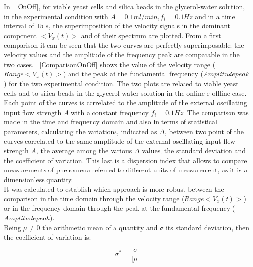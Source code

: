 \documentclass[journal]{IEEEtran}
\theoremstyle{definition}
\theoremstyle{remark}
\begin{document}
In ~\fig\ref{OnOff}, for viable yeast cells and silica beads in the glycerol-water solution, in the experimental condition with {$A=0.1 ml/min, f_i= 0.1 Hz$} and in a time interval of 15 $s$, the superimposition of the velocity signals in the dominant component  $<V_x(t)>$ and of their spectrum are plotted.
From a first comparison it can be seen that the two curves are perfectly superimposable: the velocity values and the amplitude of the frequency peak are comparable in the two cases.
~\fig\ref{ComparisonOnOff} shows the value of the velocity range ($Range<V_x(t)>$) and the peak at the fundamental frequency ($Amplitude peak$) for the two experimental condition. The two plots are related to viable yeast cells and to silica beads in the glycerol-water solution in the online e offline case. Each point of the curves is correlated to the amplitude of the external oscillating input flow strength $A$ with a constant frequency $f_i= 0.1 Hz$. 
The comparison was made in the time and frequency domain and also in terms of statistical parameters, calculating the variations, indicated as $\Delta$, between two point of the curves correlated to the same amplitude of the external oscillating input flow strength $A$, the average among the various $\Delta$ values, the standard deviation and the coefficient of variation. This last is a dispersion index that allows to compare measurements of phenomena referred to different units of measurement, as it is a dimensionless quantity. 
\\It was calculated to establish which approach is more robust between the comparison in the time domain through the velocity range ($Range<V_x(t)>$) or in the frequency domain through the peak at the fundamental frequency ($Amplitude peak$).
\\Being $\mu\neq0$ the arithmetic mean of a quantity and $\sigma$ its standard deviation, then the coefficient of variation is:

\begin{equation}
	\label{eqn:coefficient}
	\sigma^*=\frac{\sigma}{ \left|\mu\right|}
\end{equation}
\end{document}

